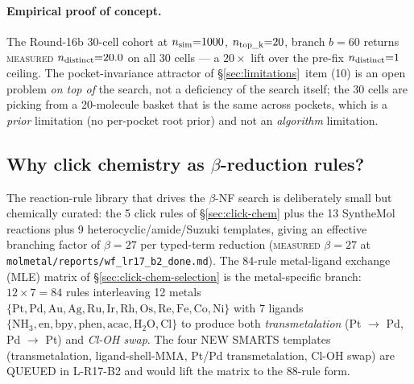 \paragraph{Empirical proof of concept.}
The Round-16b 30-cell cohort at $n_{\rm sim}{=}1000$,
$n_{\rm top\_k}{=}20$, branch $b{=}60$ returns
\textsc{measured} $n_{\rm distinct}{=}20.0$ on all 30 cells --- a
$20\times$ lift over the pre-fix $n_{\rm distinct}{=}1$ ceiling.
The pocket-invariance attractor of \S\ref{sec:limitations}~item (10)
is an open problem \emph{on top of} the search, not a deficiency of
the search itself; the 30 cells are picking from a 20-molecule
basket that is the same across pockets, which is a \emph{prior}
limitation (no per-pocket root prior) and not an \emph{algorithm}
limitation.


\subsection{Why click chemistry as $\beta$-reduction rules?}
\label{sec:discussion:click}

The reaction-rule library that drives the $\beta$-NF search is
deliberately small but chemically curated: the 5 click rules of
\S\ref{sec:click-chem} plus the 13 SyntheMol reactions plus 9
heterocyclic/amide/Suzuki templates, giving an effective branching
factor of $\beta = 27$ per typed-term reduction
(\textsc{measured} $\beta{=}27$ at
\texttt{molmetal/reports/wf\_lr17\_b2\_done.md}). The 84-rule
metal-ligand exchange (MLE) matrix of
\S\ref{sec:click-chem-selection} is the metal-specific branch:
$12 \times 7 = 84$ rules interleaving 12 metals
$\{\mathrm{Pt,Pd,Au,Ag,Ru,Ir,Rh,Os,Re,Fe,Co,Ni}\}$ with 7 ligands
$\{\mathrm{NH_3,en,bpy,phen,acac,H_2O,Cl}\}$ to produce both
\emph{transmetalation} (Pt $\to$ Pd, Pd $\to$ Pt) and \emph{Cl-OH
swap}. The four NEW SMARTS templates (transmetalation,
ligand-shell-MMA, Pt/Pd transmetalation, Cl-OH swap) are QUEUED in
L-R17-B2 and would lift the matrix to the 88-rule form.

